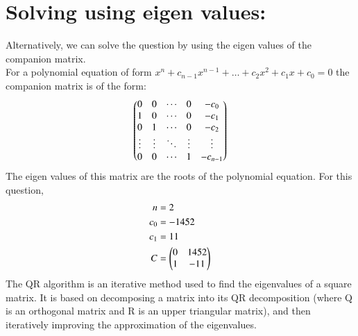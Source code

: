\documentclass[journal]{IEEEtran}
\begin{document}
\section{Solving using eigen values:}
Alternatively, we can solve the question by using the eigen values of the companion matrix.\\
For a polynomial equation of form $x^n+c_{n-1}x^{n-1}+\dots+c_2x^2+c_1x+c_0 = 0$ the companion matrix is of the form:
\begin{align}
	\begin{pmatrix}
		0 & 0 & \cdots & 0 & -c_0\\
		1 & 0 & \cdots & 0 & -c_1\\
		0 & 1 & \cdots & 0 & -c_2\\
		\vdots & \vdots & \ddots & \vdots & \vdots\\
		0 & 0 & \cdots & 1 & -c_{n-1}\\
	\end{pmatrix}
\end{align}
The eigen values of this matrix are the roots of the polynomial equation. For this question,
\begin{align}
	n &= 2\\
	c_0 &= -1452\\
	c_1 &= 11\\
	C &= \begin{pmatrix}0 & 1452 \\ 1 & -11\end{pmatrix}
\end{align}
The QR algorithm is an iterative method used to find the eigenvalues of a square matrix. It is based on decomposing a matrix into its QR decomposition (where Q is an orthogonal matrix and R is an upper triangular matrix), and then iteratively improving the approximation of the eigenvalues.
\end{document}

